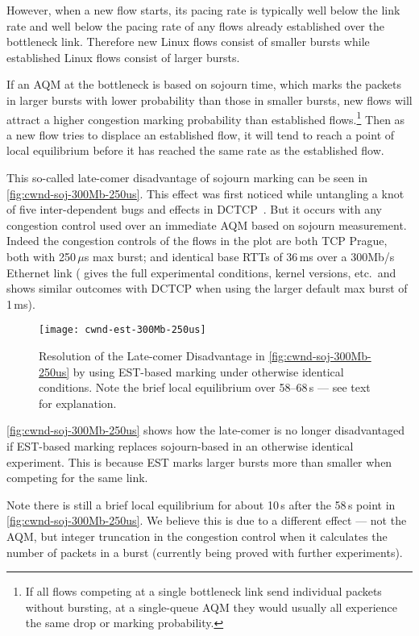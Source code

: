 However, when a new flow starts, its pacing rate is typically well below the link rate and well below the pacing rate of any flows already established over the bottleneck link. Therefore new Linux flows consist of smaller bursts while established Linux flows consist of larger bursts. 

If an AQM at the bottleneck is based on sojourn time, which marks the packets in larger bursts with lower probability than those in smaller bursts, new flows will attract a higher congestion marking probability than established flows.\footnote{If all flows competing at a single bottleneck link send individual packets without bursting, at a single-queue AQM they would usually all experience the same drop or marking probability.} Then as a new flow tries to displace an established flow, it will tend to reach a point of local equilibrium before it has reached the same rate as the established flow. 

This so-called late-comer disadvantage of sojourn marking can be seen in \autoref{fig:cwnd-soj-300Mb-250us}. This effect was first noticed while untangling a knot of five inter-dependent bugs and effects in DCTCP~\cite{Misund22a:DCTCP_bug-knot}. But it occurs with any congestion control used over an immediate AQM based on sojourn measurement. Indeed the congestion controls of the flows in the plot are both TCP Prague, both with 250\,\(\mu\)s max burst; and identical base RTTs of 36\,ms over a 300Mb/s Ethernet link (\cite{Misund22a:DCTCP_bug-knot} gives the full experimental conditions, kernel versions, etc.\ and shows similar outcomes with DCTCP when using the larger default max burst of 1\,ms). 

\begin{figure}
	\centering
	\texttt{[image: cwnd-est-300Mb-250us]}
	\caption{Resolution of the Late-comer Disadvantage in \autoref{fig:cwnd-soj-300Mb-250us} by using EST-based marking under otherwise identical conditions. Note the brief local equilibrium over 58--68\,s --- see text for explanation.}\label{fig:cwnd-est-300Mb-250us}
\end{figure}

\autoref{fig:cwnd-soj-300Mb-250us} shows how the late-comer is no longer disadvantaged if EST-based marking replaces sojourn-based in an otherwise identical experiment. This is because EST marks larger bursts more than smaller when competing for the same link.

Note there is still a brief local equilibrium for about 10\,s after the 58\,s point in \autoref{fig:cwnd-soj-300Mb-250us}. We believe this is due to a different effect --- not the AQM, but integer truncation in the congestion control when it calculates the number of packets in a burst (currently being proved with further experiments). 

